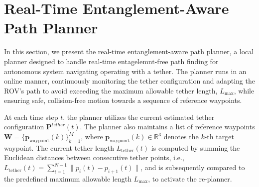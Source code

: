 









\section{Real-Time Entanglement-Aware Path Planner}
\label{sec:planner}

In this section, we present the real-time entanglement-aware path planner, a local planner designed to handle real-time entagelemnt-free path finding for autonomous system navigating operating with a tether. The planner runs in an online manner, continuously monitoring the tether configuration and adapting the \ac{ROV}'s path to avoid exceeding the maximum allowable tether length, \( L_{\text{max}} \), while ensuring safe, collision-free motion towards a sequence of reference waypoints.

At each time step \( t \), the planner utilizes the current estimated tether configuration  $\mathbf{P}^{tether}(t)$. The planner also maintains a list of reference waypoints \( \mathbf{W} = \{\mathbf{p}_{\text{waypoint}}(k)\}_{k=1}^{M} \), where \( \mathbf{p}_{\text{waypoint}}(k) \in \mathbb{R}^3 \) denotes the \( k \)-th target waypoint. The current tether length \( L_{\text{tether}}(t) \) is computed by summing the Euclidean distances between consecutive tether points, i.e., \( L_{\text{tether}}(t) = \sum_{i=1}^{N-1} \| p_i(t) - p_{i+1}(t) \| \), and is subsequently compared to the predefined maximum allowable length \( L_{\text{max}} \), to activate the re-planner.

